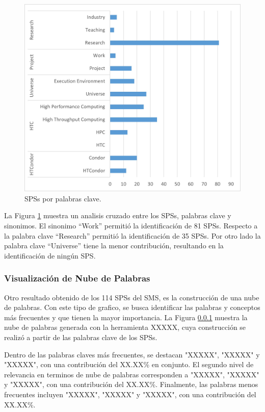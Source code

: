\begin{figure}[htbp]
	\centering
	\vspace{10pt}
	\includegraphics[scale=0.7]{resources/figures/SPSsByKeywords.jpg}
	\vspace{6pt}
	\caption{SPSs por palabras clave.}
	\label{fig:SPSsByKeywords}
\end{figure}

La Figura \ref{fig:SPSsByKeywords} muestra un analisis cruzado entre los SPSs, palabras clave y sinonimos. El sinonimo ``Work'' permitió la identificación de 81 SPSs. Respecto a la palabra clave ``Research'' permitió la identificación de 35 SPSs. Por otro lado la palabra clave ``Universe'' tiene la menor contribución, resultando en la identificación de ningún SPS.

\subsubsection{Visualización de Nube de Palabras}
Otro resultado obtenido de los 114 SPSs del SMS, es la construcción de una nube de palabras. Con este tipo de grafico, se busca identificar las palabras y conceptos más frecuentes y que tienen la mayor importancia. La Figura \ref{} muestra la nube de palabras generada con la herramienta XXXXX, cuya construcción se realizó a partir de las palabras clave de los SPSs.

Dentro de las palabras claves más frecuentes, se destacan "XXXXX", "XXXXX" y "XXXXX", con una contribución del XX.XX\% en conjunto. El segundo nivel de relevancia en terminos de nube de palabras corresponden a "XXXXX", "XXXXX" y "XXXXX", con una contribución del XX.XX\%. Finalmente, las palabras menos frecuentes incluyen "XXXXX", "XXXXX" y "XXXXX", con una contribución del XX.XX\%.
